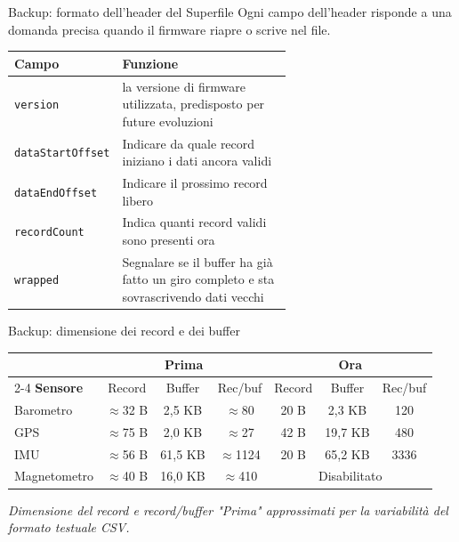 \documentclass[aspectratio=169]{beamer}
\begin{document}
\begin{frame}[noframenumbering]{Backup: formato dell'header del Superfile}
  \footnotesize
  Ogni campo dell'header risponde a una domanda precisa quando il firmware riapre o scrive nel file.

  \begin{center}
  \renewcommand{\arraystretch}{1.35}
  \begin{tabular}{@{}l p{0.62\linewidth}@{}}
    \hline
    \textbf{Campo} & \textbf{Funzione} \\
    \hline
    \texttt{version} &
      la versione di firmware utilizzata, predisposto per future evoluzioni\\
    \texttt{dataStartOffset} &
      Indicare da quale record iniziano i dati ancora validi\\
    \texttt{dataEndOffset} &
      Indicare il prossimo record libero\\
    \texttt{recordCount} &
      Indica quanti record validi sono presenti ora\\
    \texttt{wrapped} &
      Segnalare se il buffer ha già fatto un giro completo e sta sovrascrivendo dati vecchi\\
    \hline
  \end{tabular}
  \end{center}
\end{frame}

\begin{frame}[noframenumbering]{Backup: dimensione dei record e dei buffer}
  \footnotesize
  \centering
  \begin{tabular}{l ccc ccc}
    \hline
    & \multicolumn{3}{c}{\textbf{Prima}} & \multicolumn{3}{c}{\textbf{Ora}} \\
    \cline{2-4}\cline{5-7}
    \textbf{Sensore} & Record & Buffer & Rec/buf & Record & Buffer & Rec/buf \\
    \hline
    Barometro    & $\approx$32 B & 2{,}5 KB  & $\approx$80   & 20 B & 2{,}3 KB  & 120  \\
    GPS          & $\approx$75 B & 2{,}0 KB  & $\approx$27   & 42 B & 19{,}7 KB & 480  \\
    IMU          & $\approx$56 B & 61{,}5 KB & $\approx$1124 & 20 B & 65{,}2 KB & 3336 \\
    Magnetometro & $\approx$40 B & 16{,}0 KB & $\approx$410  & \multicolumn{3}{c}{Disabilitato} \\
    \hline
  \end{tabular}

  \vspace{0.4cm}
  \tiny\itshape
  Dimensione del record e record/buffer
  "Prima" approssimati per la variabilità del formato testuale CSV.
\end{frame}
\end{document}
